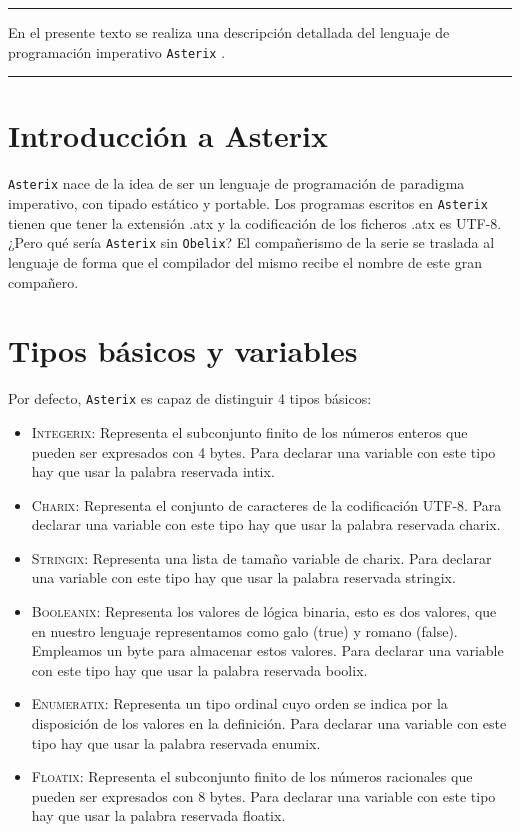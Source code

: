 \documentclass[a4paper, 10pt]{article}
\newcommand{\atx}{\texttt{Asterix} }
\begin{document}
    \begin{small}
        \hrule
        \vspace{\baselineskip}
        En el presente texto se realiza una descripción detallada del lenguaje
        de programación imperativo \atx. 
        \vspace{\baselineskip}\hrule
    \end{small}

    \section*{Introducción a Asterix}
    \atx nace de la idea de ser un lenguaje de programación de paradigma 
    imperativo, con tipado estático y portable. Los programas escritos en \atx tienen que
    tener la extensión .atx y la codificación de los ficheros .atx es UTF-8.
    ¿Pero qué sería \atx sin \texttt{Obelix}? El compañerismo de la serie 
    se traslada al lenguaje de forma que el compilador del mismo recibe el
    nombre de este gran compañero. 

    \section*{Tipos básicos y variables}
    Por defecto, \atx es capaz de distinguir 4 tipos básicos:
    \begin{itemize}
        \item \textsc{Integerix}: Representa el subconjunto finito de los números
            enteros que pueden ser expresados con 4 bytes. Para declarar una
            variable con este tipo hay que usar la palabra reservada \textsf{intix}.
        \item \textsc{Charix}: Representa el conjunto de caracteres de la
            codificación UTF-8. Para declarar una variable con este tipo hay
            que usar la palabra reservada \textsf{charix}.
        \item \textsc{Stringix}: Representa una lista de tamaño variable de
            charix. Para declarar una variable con este tipo hay que usar la
            palabra reservada \textsf{stringix}.
        \item \textsc{Booleanix}: Representa los valores de lógica binaria, esto
            es dos valores, que en nuestro lenguaje representamos como
            \textsf{galo} (true) y \textsf{romano} (false). Empleamos un byte
            para almacenar estos valores. Para declarar una variable con este
            tipo hay que usar la palabra reservada \textsf{boolix}.
        \item \textsc{Enumeratix}: Representa un tipo ordinal cuyo orden se indica por 
            la disposición de los valores en la definición. Para declarar una
            variable con este tipo hay que usar la palabra reservada \textsf{enumix}.
        \item \textsc{Floatix}: Representa el subconjunto finito de los números
            racionales que pueden ser expresados con 8 bytes. Para declarar una
            variable con este tipo hay que usar la palabra reservada \textsf{floatix}.
    \end{itemize}
\end{document}
